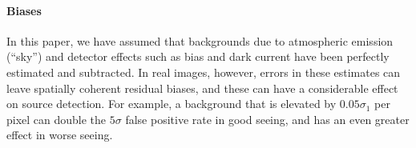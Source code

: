 \documentclass[letterpaper,preprint]{aastex62}
\newcommand{\psf}{\psi}
\begin{document}
\paragraph{Biases}
In this paper, we have assumed that backgrounds due to atmospheric
emission (``sky'') and detector effects such as bias and dark current
have been perfectly estimated and subtracted.  In real images,
however, errors in these estimates can leave spatially coherent
residual biases, and these can have a considerable effect on source
detection.  For example, a background that is elevated by $0.05
\sigma_1$ per pixel can double the $5\sigma$ false positive rate in
good seeing, and has an even greater effect in worse seeing.


%










\end{document}
